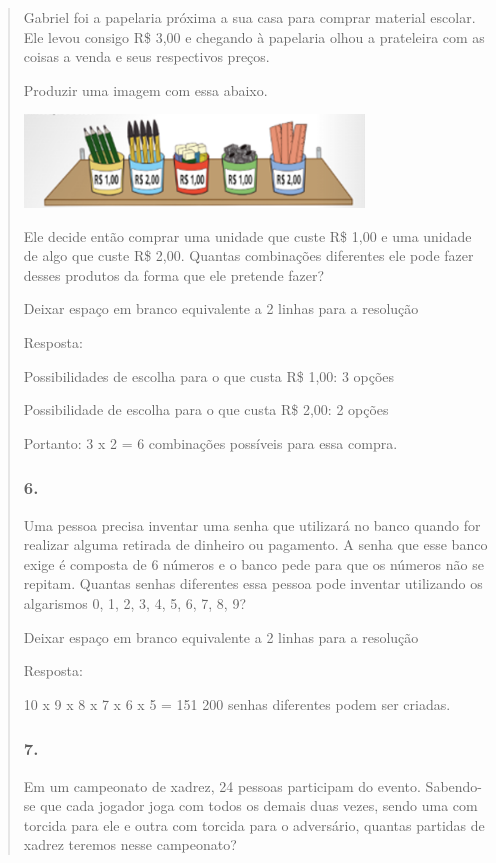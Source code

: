 \begin{enumerate}
\begin{escolha}
\begin{enumerate}
\begin{itemize}
\begin{itemize}
\begin{escolha}
\begin{quote}
\begin{escolha}
{Gabriel foi a papelaria próxima a sua casa para comprar material
escolar. Ele levou consigo R\$ 3,00 e chegando à papelaria olhou a
prateleira com as coisas a venda e seus respectivos preços.

Produzir uma imagem com essa abaixo.

\includegraphics[width=3.55864in,height=0.97508in]{media/image139.png}

Ele decide então comprar uma unidade que custe R\$ 1,00 e uma unidade de
algo que custe R\$ 2,00. Quantas combinações diferentes ele pode fazer
desses produtos da forma que ele pretende fazer?

Deixar espaço em branco equivalente a 2 linhas para a resolução

Resposta:

Possibilidades de escolha para o que custa R\$ 1,00: 3 opções

Possibilidade de escolha para o que custa R\$ 2,00: 2 opções

Portanto: 3 x 2 = 6 combinações possíveis para essa compra.

\subsubsection{6.}\label{section-135}

Uma pessoa precisa inventar uma senha que utilizará no banco quando for
realizar alguma retirada de dinheiro ou pagamento. A senha que esse
banco exige é composta de 6 números e o banco pede para que os números
não se repitam. Quantas senhas diferentes essa pessoa pode inventar
utilizando os algarismos 0, 1, 2, 3, 4, 5, 6, 7, 8, 9?

Deixar espaço em branco equivalente a 2 linhas para a resolução

Resposta:

10 x 9 x 8 x 7 x 6 x 5 = 151 200 senhas diferentes podem ser criadas.

\subsubsection{7.}\label{section-136}

Em um campeonato de xadrez, 24 pessoas participam do evento. Sabendo-se
que cada jogador joga com todos os demais duas vezes, sendo uma com
torcida para ele e outra com torcida para o adversário, quantas partidas
de xadrez teremos nesse campeonato?

}
\end{escolha}
\end{quote}
\end{escolha}
\end{itemize}
\end{itemize}
\end{enumerate}
\end{escolha}
\end{enumerate}

